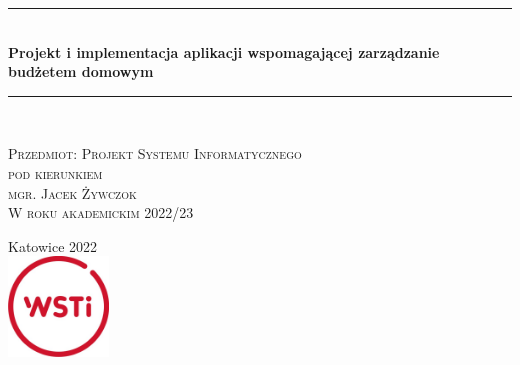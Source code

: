 \documentclass[a4paper,10pt, twoside]{report}
\newcommand{\customstyletitle}[1]{\Huge{\textbf{#1}}}
\newcommand{\HRule}{\rule{\linewidth}{0.5mm}} %
\begin{document}
\begin{large}
\begin{titlepage}
	\begin{center}
    \HRule\\[0.4cm]
	{\customstyletitle{Projekt i implementacja aplikacji wspomagającej zarządzanie budżetem domowym}}\\[0.4cm] 
    \HRule\\[1.5cm]
    \end{center}
	
	\begin{flushright}
        \textsc{Przedmiot: Projekt Systemu Informatycznego}\\[0cm]
        \textsc{pod kierunkiem}\\[0cm]
        \textsc{mgr. Jacek Żywczok}\\[0cm]
        \textsc{W roku akademickim 2022/23}\\[0cm]
    \end{flushright}
 
	\vfill                  %
	\begin{center}
    {Katowice 2022}\\	    %
	\includegraphics[width=0.2\textwidth]{figures/WSTI-logo.jpg}\\[1cm]
	\end{center}
\end{titlepage}

\null\newpage %

\renewcommand*\contentsname{Spis treści}
\tableofcontents                    %




\end{large}
\end{document}
